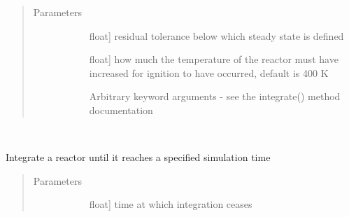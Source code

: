 \documentclass[letterpaper,10pt,english]{sphinxmanual}
\begin{document}
\begin{fulllineitems}
\begin{fulllineitems}
\begin{description}
\end{description}
\begin{quote}\begin{description}
\item[{Parameters}] \leavevmode\begin{description}
\item[{}] \leavevmode{[}float{]}
residual tolerance below which steady state is defined

\item[{}] \leavevmode{[}float{]}
how much the temperature of the reactor must have increased for ignition to have occurred, default is 400 K

\item[{}] \leavevmode
Arbitrary keyword arguments - see the integrate() method documentation

\end{description}

\end{description}\end{quote}

\end{fulllineitems}


\begin{fulllineitems}
\label{\detokenize{spitfire.chemistry.reactors:spitfire.chemistry.reactors.HomogeneousReactor.integrate_to_steady_direct_griffon}}~
\end{fulllineitems}


\begin{fulllineitems}
\label{\detokenize{spitfire.chemistry.reactors:spitfire.chemistry.reactors.HomogeneousReactor.integrate_to_time}}
Integrate a reactor until it reaches a specified simulation time
\begin{quote}\begin{description}
\item[{Parameters}] \leavevmode\begin{description}
\item[{}] \leavevmode{[}float{]}
time at which integration ceases


\end{description}
\end{description}
\end{quote}
\end{fulllineitems}
\end{fulllineitems}
\end{document}
